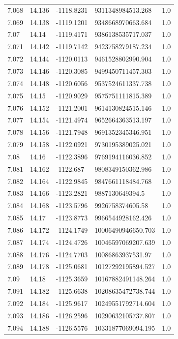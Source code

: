 \begin{tabular}{lllll}
7.068 & 14.136 & -1118.8231 & 9311348984513.268 & 1.0 \\
7.069 & 14.138 & -1119.1201 & 9348668970663.684 & 1.0 \\
7.07 & 14.14 & -1119.4171 & 9386138535717.037 & 1.0 \\
7.071 & 14.142 & -1119.7142 & 9423758279187.234 & 1.0 \\
7.072 & 14.144 & -1120.0113 & 9461528802990.904 & 1.0 \\
7.073 & 14.146 & -1120.3085 & 9499450711457.303 & 1.0 \\
7.074 & 14.148 & -1120.6056 & 9537524611337.738 & 1.0 \\
7.075 & 14.15 & -1120.9029 & 9575751111815.389 & 1.0 \\
7.076 & 14.152 & -1121.2001 & 9614130824515.146 & 1.0 \\
7.077 & 14.154 & -1121.4974 & 9652664363513.197 & 1.0 \\
7.078 & 14.156 & -1121.7948 & 9691352345346.951 & 1.0 \\
7.079 & 14.158 & -1122.0921 & 9730195389025.021 & 1.0 \\
7.08 & 14.16 & -1122.3896 & 9769194116036.852 & 1.0 \\
7.081 & 14.162 & -1122.687 & 9808349150362.986 & 1.0 \\
7.082 & 14.164 & -1122.9845 & 9847661118484.768 & 1.0 \\
7.083 & 14.166 & -1123.2821 & 9887130649394.5 & 1.0 \\
7.084 & 14.168 & -1123.5796 & 9926758374605.58 & 1.0 \\
7.085 & 14.17 & -1123.8773 & 9966544928162.426 & 1.0 \\
7.086 & 14.172 & -1124.1749 & 10006490946650.703 & 1.0 \\
7.087 & 14.174 & -1124.4726 & 10046597069207.639 & 1.0 \\
7.088 & 14.176 & -1124.7703 & 10086863937531.97 & 1.0 \\
7.089 & 14.178 & -1125.0681 & 10127292195894.527 & 1.0 \\
7.09 & 14.18 & -1125.3659 & 10167882491148.264 & 1.0 \\
7.091 & 14.182 & -1125.6638 & 10208635472738.744 & 1.0 \\
7.092 & 14.184 & -1125.9617 & 10249551792714.604 & 1.0 \\
7.093 & 14.186 & -1126.2596 & 10290632105737.807 & 1.0 \\
7.094 & 14.188 & -1126.5576 & 10331877069094.195 & 1.0 \\

\end{tabular}

